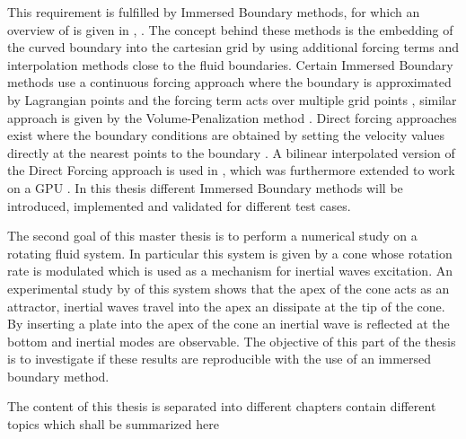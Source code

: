 This requirement is fulfilled by Immersed Boundary methods, for which an
 overview of is given in \citep{Mittal2005}, \citep{Gornak2013}.
The concept behind these methods is the embedding of the curved boundary into the cartesian grid
by using additional forcing terms and interpolation methods close to the fluid boundaries.
Certain Immersed Boundary methods use a continuous forcing approach where the boundary is approximated by Lagrangian points
and the forcing term acts over multiple grid points \citep{Mittal2005},
similar approach is given by the Volume-Penalization method \citep{Lulff2011}.
Direct forcing approaches exist where the boundary conditions are obtained by setting the
velocity values directly at the nearest points to the boundary \citep{Fadlun2000}.
A bilinear interpolated version of the Direct Forcing approach is used in \citep{Gornak2013},
which was furthermore extended to work on a GPU \citep{DeLeon2012}.
In this thesis different Immersed Boundary methods will be introduced, implemented and
validated for different test cases.

\bigbreak

The second goal of this master thesis is to perform a numerical study on a rotating fluid system.
In particular this system is given by a cone whose rotation rate is modulated which is used as a mechanism for inertial waves excitation.
An experimental study by  \citeauthor{Beardsley1970} \citep{Beardsley1970} of this system shows that the apex of the cone acts as an attractor,
inertial waves travel into the apex an dissipate at the tip of the cone.
By inserting a plate into the apex of the cone an inertial wave is reflected at the bottom and inertial modes are observable.
The objective of this part of the thesis is to investigate if these results
are reproducible with the use of an immersed boundary method.

\bigbreak

The content of this thesis is separated into different chapters contain different topics which shall be summarized here

